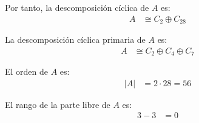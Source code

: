 \documentclass[12pt]{article}
\begin{document}
\begin{ejercicio}
        Por tanto, la descomposición cíclica de $A$ es:
        \begin{align*}
            A & \cong C_2 \oplus C_{28}
        \end{align*}

        La descomposición cíclica primaria de $A$ es:
        \begin{align*}
            A & \cong C_2 \oplus C_4 \oplus C_{7}
        \end{align*}

        El orden de $A$ es:
        \begin{align*}
            |A| & = 2\cdot 28 = 56
        \end{align*}

        El rango de la parte libre de $A$ es:
        \begin{align*}
            3-3 & = 0
        \end{align*}


\end{ejercicio}
\end{document}
